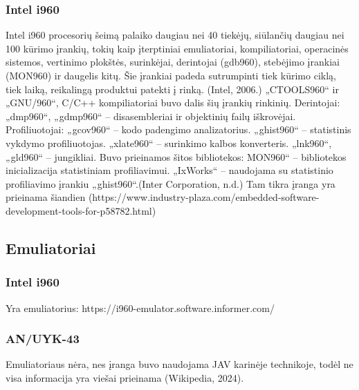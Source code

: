 \documentclass{article}
\begin{document}
\subsubsection{Intel i960}
Intel i960 procesorių šeimą palaiko daugiau nei 40 tiekėjų, siūlančių daugiau nei 100 kūrimo įrankių, tokių kaip įterptiniai emuliatoriai, kompiliatoriai, operacinės sistemos, vertinimo plokštės, surinkėjai, derintojai (gdb960), stebėjimo įrankiai (MON960) ir daugelis kitų. Šie įrankiai padeda sutrumpinti tiek kūrimo ciklą, tiek laiką, reikalingą produktui patekti į rinką. (Intel, 2006.) „CTOOLS960“ ir „GNU/960“, C/C++ kompiliatoriai buvo dalis šių įrankių rinkinių.  Derintojai: „dmp960“, „gdmp960“ – disasembleriai ir objektinių failų iškrovėjai. Profiliuotojai: „gcov960“ – kodo padengimo analizatorius. „ghist960“ – statistinis vykdymo profiliuotojas. „xlate960“ – surinkimo kalbos konverteris. „lnk960“, „gld960“ – jungikliai. Buvo prieinamos šitos bibliotekos: MON960“ – bibliotekos inicializacija statistiniam profiliavimui. „IxWorks“ – naudojama su statistinio profiliavimo įrankiu „ghist960“.(Inter Corporation, n.d.) Tam tikra įranga yra prieinama šiandien (https://www.industry-plaza.com/embedded-software-development-tools-for-p58782.html)
\subsection{Emuliatoriai}
\subsubsection{Intel i960}
Yra emuliatorius: https://i960-emulator.software.informer.com/
\subsubsection{AN/UYK-43}
Emuliatoriaus nėra, nes įranga buvo naudojama JAV karinėje technikoje, todėl ne visa informacija yra viešai prieinama (Wikipedia, 2024).
\end{document}
